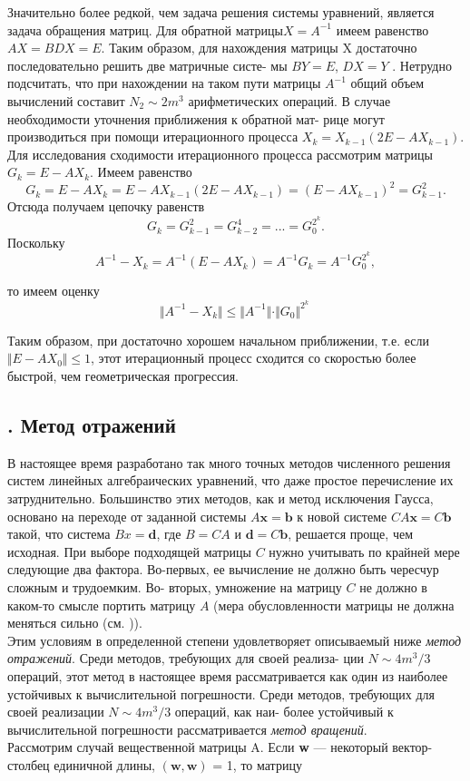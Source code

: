 \documentclass[a4paper, twoside, 12pt]{article}
\begin{document}
\indent Значительно более редкой, чем задача решения системы уравнений, является задача обращения матриц. Для обратной матрицы$ X = A^{-1}$ имеем равенство $AX = BDX = E$. Таким образом, для нахождения матрицы X достаточно последовательно решить две матричные систе- мы $BY = E$, $DX = Y$ . Нетрудно подсчитать, что при нахождении на таком пути матрицы $A^{-1}$ общий объем вычислений составит $N_{2} \sim 2m^3$ арифметических операций.
\indent В случае необходимости уточнения приближения к обратной мат- рице могут производиться при помощи итерационного процесса $X_{k }= X_{k-1}(2E-AX_{k-1})$. Для исследования сходимости итерационного процесса рассмотрим матрицы $G_{k} = E - AX_{k}$. Имеем равенство
\[
G_{k} =E - AX_{k} =E-AX_{k-1}(2E-AX_{k-1})=(E-AX_{k-1})^2 =G_{k-1}^2.
\]
Отсюда получаем цепочку равенств
\[
G_{k} = G_{k-1}^2 = G_{k-2}^4 = ... = G_{0}^{2^{k}}.
\]
Поскольку
\[
A^{-1} - X_{k} = A^{-1}(E - AX_{k})=A^{-1}G_{k}=A^{-1}G_{0}^{2^{k}},
\]

\noindent то имеем оценку
\[ \Vert A^{-1} - X_{k} \Vert \leq \Vert A^{-1} \Vert \cdot \Vert G_{0} \Vert ^{2^{k}} \ \] 

Таким образом, при достаточно хорошем начальном приближении, т.е.
если $\Vert E - AX_{0} \Vert \leq 1$, этот итерационный процесс сходится со скоростью более быстрой, чем геометрическая прогрессия.

\begin{center}
    \section*{. Метод отражений
}
\end{center}
\noindent В настоящее время разработано так много точных методов численного решения систем линейных алгебраических уравнений, что даже простое перечисление их затруднительно. Большинство этих методов, как и метод исключения Гаусса, основано на переходе от заданной системы $A\textbf{x} = \textbf{b}$ к новой системе $CA\textbf{x}=C\textbf{b}$ такой, что система $Bx=\textbf{d}$, где $B=CA$ и $\textbf{d}= C\textbf{b}$, решается проще, чем исходная. При выборе подходящей матрицы $C$ нужно учитывать по крайней мере следующие два фактора. Во-первых, ее вычисление не должно быть чересчур сложным и трудоемким. Во- вторых, умножение на матрицу $C$ не должно в каком-то смысле портить матрицу $A$ (мера обусловленности матрицы не должна меняться сильно (см. )).
\\ \indent
Этим условиям в определенной степени удовлетворяет описываемый ниже \textit{метод отражений}. Среди методов, требующих для своей реализа- ции $N \sim 4m^3/3$ операций, этот метод в настоящее время рассматривается как один из наиболее устойчивых к вычислительной погрешности. Среди методов, требующих для своей реализации $N \sim 4m^3/3$  операций, как наи- более устойчивый к вычислительной погрешности рассматривается \textit{метод вращений}.
\\ \indent Рассмотрим случай вещественной матрицы A. Если \textbf{w} — некоторый вектор-столбец единичной длины, $(\textbf{w}, \textbf{w})$ = 1, то матрицу
\end{document}
